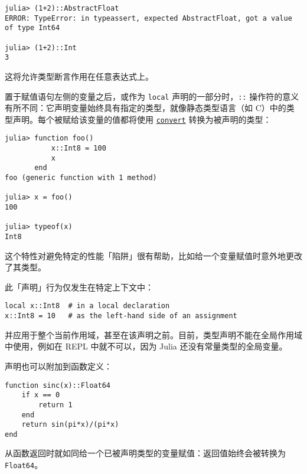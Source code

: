 \begin{verbatim}
julia> (1+2)::AbstractFloat
ERROR: TypeError: in typeassert, expected AbstractFloat, got a value of type Int64

julia> (1+2)::Int
3
\end{verbatim}



这将允许类型断言作用在任意表达式上。



置于赋值语句左侧的变量之后，或作为 \texttt{local} 声明的一部分时，\texttt{::} 操作符的意义有所不同：它声明变量始终具有指定的类型，就像静态类型语言（如 C）中的类型声明。每个被赋给该变量的值都将使用 \hyperlink{1846942650946171605}{\texttt{convert}} 转换为被声明的类型：




\begin{verbatim}
julia> function foo()
           x::Int8 = 100
           x
       end
foo (generic function with 1 method)

julia> x = foo()
100

julia> typeof(x)
Int8
\end{verbatim}



这个特性对避免特定的性能「陷阱」很有帮助，比如给一个变量赋值时意外地更改了其类型。



此「声明」行为仅发生在特定上下文中：




\begin{verbatim}
local x::Int8  # in a local declaration
x::Int8 = 10   # as the left-hand side of an assignment
\end{verbatim}



并应用于整个当前作用域，甚至在该声明之前。目前，类型声明不能在全局作用域中使用，例如在 REPL 中就不可以，因为 Julia 还没有常量类型的全局变量。



声明也可以附加到函数定义：




\begin{verbatim}
function sinc(x)::Float64
    if x == 0
        return 1
    end
    return sin(pi*x)/(pi*x)
end
\end{verbatim}



从函数返回时就如同给一个已被声明类型的变量赋值：返回值始终会被转换为\texttt{Float64}。



